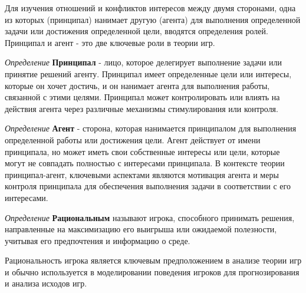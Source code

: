 Для изучения отношений и конфликтов интересов между двумя сторонами, одна из которых (принципал) нанимает другую (агента) для выполнения определенной задачи или достижения определенной цели, вводятся определения ролей. Принципал и агент - это две ключевые роли в теории игр.


\textit{Определение} \textbf{Принципал} -  лицо, которое делегирует выполнение задачи или принятие решений агенту. Принципал имеет определенные цели или интересы, которые он хочет достичь, и он нанимает агента для выполнения работы, связанной с этими целями. Принципал может контролировать или влиять на действия агента через различные механизмы стимулирования или контроля.

\textit{Определение}  \textbf{Агент} - сторона, которая нанимается принципалом для выполнения определенной работы или достижения цели. Агент действует от имени принципала, но может иметь свои собственные интересы или цели, которые могут не совпадать полностью с интересами принципала. В контексте теории принципал-агент, ключевыми аспектами являются мотивация агента и меры контроля принципала для обеспечения выполнения задачи в соответствии с его интересами.


\textit{Определение} \textbf{Рациональным} называют игрока, способного принимать решения, направленные на максимизацию его выигрыша или ожидаемой полезности, учитывая его предпочтения и информацию о среде.

Рациональность игрока является ключевым предположением в анализе теории игр и обычно используется в моделировании поведения игроков для прогнозирования и анализа исходов игр.


